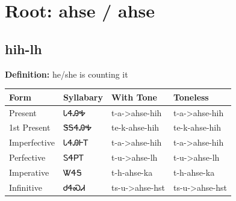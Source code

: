 \documentclass{article}%
\begin{document}
%
\normalsize%
\section*{Root: ahse / ahse}%
\subsection*{hih-lh}%
\textbf{Definition: }%
he/she is counting it%
\\[0.5em]%
\begin{tabular}{|l|l|l|l|}%
\hline%
\textbf{Form}&\textbf{Syllabary}&\textbf{With Tone}&\textbf{Toneless}\\%
\hline%
Present&ᏓᏎᎯᎭ&t{-}a{-}>ahse{-}hih&t{-}a{-}>ahse{-}hih\\%
1st Present&ᏕᎦᏎᎯᎭ&te{-}k{-}ahse{-}hih&te{-}k{-}ahse{-}hih\\%
Imperfective&ᏓᏎᎯᎰᎢ&t{-}a{-}>ahse{-}hih&t{-}a{-}>ahse{-}hih\\%
Perfective&ᏚᏎᏢᎢ&t{-}u{-}>ahse{-}lh&t{-}u{-}>ahse{-}lh\\%
Imperative&ᏔᏎᎦ&t{-}h{-}ahse{-}ka&t{-}h{-}ahse{-}ka\\%
Infinitive&ᏧᏎᏍᏗ&ts{-}u{-}>ahse{-}hst&ts{-}u{-}>ahse{-}hst\\%
\hline%
\end{tabular}%
\\[1em]%
\end{document}
